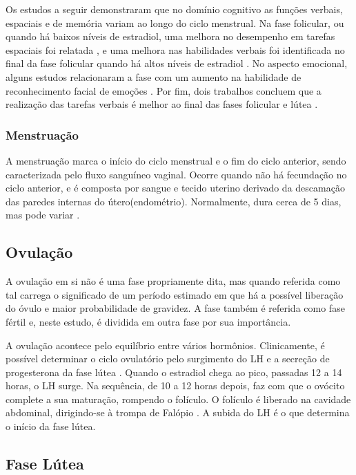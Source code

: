 Os estudos a seguir demonstraram que no domínio cognitivo 
as funções verbais, espaciais e de memória variam ao longo do ciclo 
menstrual. Na fase folicular, ou quando há baixos níveis de estradiol, 
uma melhora no desempenho em tarefas espaciais foi relatada 
\cite{hausmann2000,maki2002, courvoisier2013, becker1982, phillips1992}, 
e uma melhora nas habilidades verbais foi identificada 
no final da fase folicular quando há altos níveis de estradiol 
\cite{Rosenberg2002}. No aspecto emocional, alguns estudos relacionaram a 
fase com um aumento na habilidade de reconhecimento facial de emoções 
\cite{derntl2013}. Por fim, dois trabalhos concluem que a realização das tarefas verbais é melhor 
ao final das fases folicular e lútea \cite{Rosenberg2002, solis2004}.


\subsubsection{Menstruação}

A menstruação marca o início do ciclo menstrual e o fim do ciclo anterior, sendo 
caracterizada pelo fluxo sanguíneo vaginal. Ocorre quando não há 
fecundação no ciclo anterior, e é composta por sangue e tecido uterino 
derivado da descamação das paredes internas do útero(endométrio). 
Normalmente, dura cerca de 5 dias, mas pode variar \cite{guyton2012}.

\subsection{Ovulação}

A ovulação em si não é uma fase propriamente dita, mas quando referida 
como tal carrega o significado de um período estimado em que há a 
possível liberação do óvulo e maior probabilidade de gravidez. 
A fase também é referida como fase fértil e, neste estudo, é dividida em 
outra fase por sua importância.

A ovulação acontece pelo equilíbrio entre vários hormônios. 
Clinicamente, é possível determinar o ciclo ovulatório pelo surgimento do 
LH e a secreção de progesterona da fase lútea \cite{fritz2010}. 
Quando o estradiol chega ao pico, passadas 12 a 14 horas, o LH surge. 
Na sequência, de 10 a 12 horas depois, faz com que o ovócito complete a 
sua maturação, rompendo o folículo. O folículo é liberado na cavidade 
abdominal, dirigindo-se à trompa de Falópio \cite{fritz2010}. 
A subida do LH é o que determina o início da fase lútea.

\subsection{Fase Lútea}

